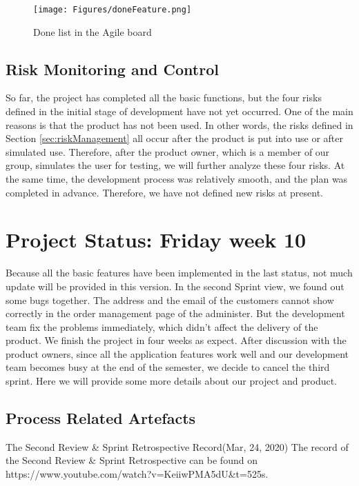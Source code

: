 \begin{figure}[htp]
\centering
\texttt{[image: Figures/doneFeature.png]}
\caption{Done list in the Agile board}
\label{fig:doneFeature}
\end{figure}

\clearpage
\subsection{Risk Monitoring and Control}
\label{sub:riskMonitoringandControl}
So far, the project has completed all the basic functions, but the four risks defined in the initial stage of development have not yet occurred. One of the main reasons is that the product has not been used. In other words, the risks defined in Section \ref{sec:riskManagement} all occur after the product is put into use or after simulated use. Therefore, after the product owner, which is a member of our group, simulates the user for testing, we will further analyze these four risks.
At the same time, the development process was relatively smooth, and the plan was completed in advance. Therefore, we have not defined new risks at present.

\clearpage
\section{Project Status: Friday week 10}
\label{sec:ps2}
Because all the basic features have been implemented in the last status, not much update will be provided in this version. In the second Sprint view, we found out some bugs together. The address and the email of the customers cannot show correctly in the order management page of the administer. But the development team fix the problems immediately, which didn't affect the delivery of the product. We finish the project in four weeks as expect. After discussion with the product owners, since all the application features work well and our development team becomes busy at the end of the semester, we decide to cancel the third sprint. Here we will provide some more details about our project and product.


\subsection{Process Related Artefacts}
The Second Review \& Sprint Retrospective Record(Mar, 24, 2020)
The record of the Second Review \& Sprint Retrospective can be found on https://www.youtube.com/watch?v=KeiiwPMA5dU\&t=525s. 

